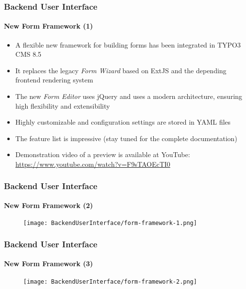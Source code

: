 \begin{frame}[fragile]
	\frametitle{Backend User Interface}
	\framesubtitle{New Form Framework (1)}

	\begin{itemize}
		\item A flexible new framework for building forms has been integrated in TYPO3 CMS 8.5
		\item It replaces the legacy \textit{Form Wizard} based on ExtJS and the depending frontend rendering system
		\item The new \textit{Form Editor} uses jQuery and uses a modern architecture,
			ensuring high flexibility and extensibility
		\item Highly customizable and configuration settings are stored in YAML files
		\item The feature list is impressive\newline
			\small(stay tuned for the complete documentation)\normalsize
		\item Demonstration video of a preview is available at YouTube:\newline
			\url{https://www.youtube.com/watch?v=F9sTAOEcTI0}
	\end{itemize}

\end{frame}
\begin{frame}[fragile]
	\frametitle{Backend User Interface}
	\framesubtitle{New Form Framework (2)}

	\begin{figure}
		\texttt{[image: BackendUserInterface/form-framework-1.png]}
	\end{figure}

\end{frame}

\begin{frame}[fragile]
	\frametitle{Backend User Interface}
	\framesubtitle{New Form Framework (3)}

	\begin{figure}
		\texttt{[image: BackendUserInterface/form-framework-2.png]}
	\end{figure}

\end{frame}


